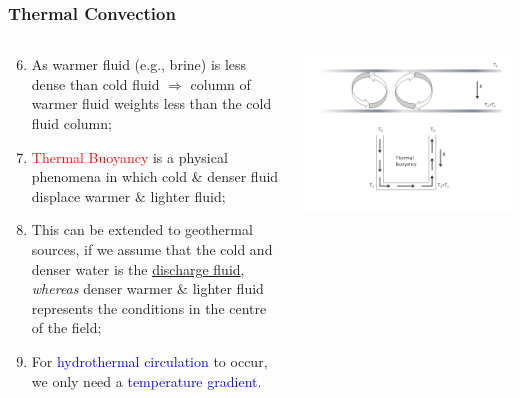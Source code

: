 \documentclass[10pt,compress]{beamer}
\newcommand{\red}{\textcolor{red}}
\newcommand{\blue}{\textcolor{blue}}
\begin{document}
\begin{frame}
 \frametitle{Thermal Convection}
  \begin{columns}
   \begin{column}[c]{0.45\linewidth}
    \begin{enumerate}[1.]\setcounter{enumi}{5} \scriptsize
       \item <1-> As warmer fluid (e.g., brine) is less dense than cold fluid $\Longrightarrow$ column of warmer fluid weights less than the cold fluid column;
       \item <2-> \red{Thermal Buoyancy} is a physical phenomena in which cold $\&$ denser fluid displace warmer $\&$ lighter fluid;
       \item <3-> This can be extended to geothermal sources, if we assume that the cold and denser water is the \underline{discharge fluid}, {\it whereas} denser warmer $\&$ lighter fluid represents the conditions in the centre of the field; 
       \item <4-> For \blue{hydrothermal circulation} to occur, we only need a \blue{temperature gradient}. 
    \end{enumerate}
   \end{column}
   \begin{column}[c]{0.55\linewidth}
     \begin{center}
        \includegraphics[width=\columnwidth,clip]{./Pics/GeothermalConvection.png}
     \end{center}
   \end{column}  
  \end{columns}
\end{frame}
\end{document}

